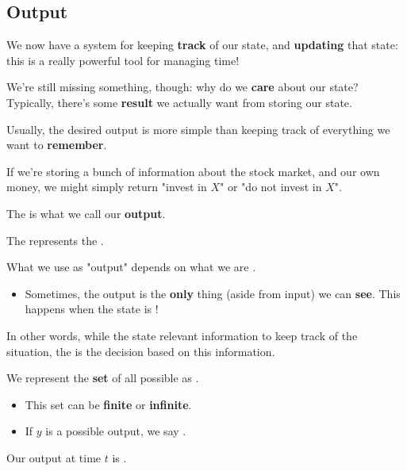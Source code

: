     \pagebreak
        
    \subsection{Output}
        
        We now have a system for keeping \textbf{track} of our state, and \textbf{updating} that state: this is a really powerful tool for managing time!
        
        We're still missing something, though: why do we \textbf{care} about our state? Typically, there's some \textbf{result} we actually want from storing our state.

        \subsecdiv
        
        Usually, the desired output is more simple than keeping track of everything we want to \textbf{remember}.
            
        \miniex If we're storing a bunch of information about the stock market, and our own money, we might simply return "invest in $X$" or "do not invest in $X$".
        
        The is what we call our \textbf{output}.\\
        
        \begin{definition}
            The   represents the . 
            
            What we use as "output" depends on what we are .
            
                \begin{itemize}
                    \item Sometimes, the output is the \textbf{only} thing (aside from input) we can \textbf{see}. This happens when the state is !
                \end{itemize}

            \subsecdiv
            
            In other words, while the state  relevant information to keep track of the situation, the  is the decision based on this information.
            
            We represent the \textbf{set} of all possible  as .
            
            \begin{itemize}
                \item This set can be \textbf{finite} or \textbf{infinite}.
                \item If $y$ is a possible output, we say .
            \end{itemize}
                
            Our output at time $t$ is .
        \end{definition}

